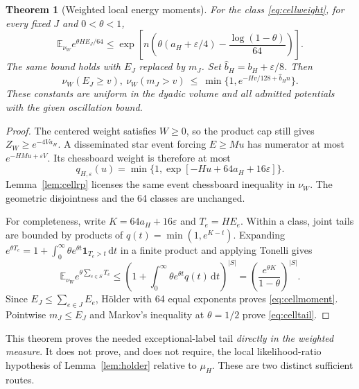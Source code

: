 \documentclass[11pt]{article}
\newtheorem{theorem}{Theorem}[section]
\theoremstyle{definition}
\theoremstyle{remark}
\newcommand{\one}{\mathbf 1}
\newcommand{\E}{\mathbb E}
\newcommand{\dd}{\,\mathrm d}
\begin{document}
\begin{theorem}[Weighted local energy moments]\label{thm:cellmoment}
For the class \eqref{eq:cellweight}, for every fixed $J$ and $0<\theta<1$,
\begin{equation}
 \E_{\nu_W}e^{\theta HE_J/64}
 \le\exp\left[n\left(\theta(a_H+\varepsilon/4)
                      -\frac{\log(1-\theta)}{64}\right)\right].
 \label{eq:cellmoment}
\end{equation}
The same bound holds with $E_J$ replaced by $m_J$. Set
$\widehat b_H=b_H+\varepsilon/8$. Then
\begin{equation}
 \nu_W(E_J\ge v),\ \nu_W(m_J>v)
 \ \le\ \min\{1,e^{-Hv/128+\widehat b_H n}\}.
 \label{eq:celltail}
\end{equation}
These constants are uniform in the dyadic volume and all admitted
potentials with the given oscillation bound.
\end{theorem}
\begin{proof}
The centered weight satisfies $W\ge0$, so the product cap still gives
$Z_W\ge e^{-4Va_H}$. A disseminated star event forcing $E\ge Mu$ has
numerator at most $e^{-HMu+\varepsilon V}$. Its chessboard weight is
therefore at most
\begin{equation}
 q_{H,\varepsilon}(u)
 =\min\{1,\exp[-Hu+64a_H+16\varepsilon]\}.
 \label{eq:tiltedstar}
\end{equation}
Lemma~\ref{lem:cellrp} licenses the same event chessboard inequality in
$\nu_W$. The geometric disjointness and the 64 classes are unchanged.

For completeness, write $K=64a_H+16\varepsilon$ and $T_e=HE_e$.
Within a class, joint tails are bounded by products of
$q(t)=\min(1,e^{K-t})$. Expanding
$e^{\theta T_e}=1+\int_0^\infty\theta e^{\theta t}\one_{T_e>t}\dd t$
in a finite product and applying Tonelli gives
\[
 \E_{\nu_W}e^{\theta\sum_{e\in S}T_e}
 \le\left(1+\int_0^\infty\theta e^{\theta t}q(t)\dd t\right)^{|S|}
 =\left(\frac{e^{\theta K}}{1-\theta}\right)^{|S|}.
\]
Since $E_J\le\sum_{e\in J}E_e$, H\"older with 64 equal exponents proves
\eqref{eq:cellmoment}. Pointwise $m_J\le E_J$ and Markov's inequality at
$\theta=1/2$ prove \eqref{eq:celltail}.
\end{proof}
This theorem proves the needed exceptional-label tail \emph{directly in
the weighted measure}. It does not prove, and does not require, the
local likelihood-ratio hypothesis of Lemma~\ref{lem:holder} relative to
$\mu_H$. These are two distinct sufficient routes.
\end{document}
